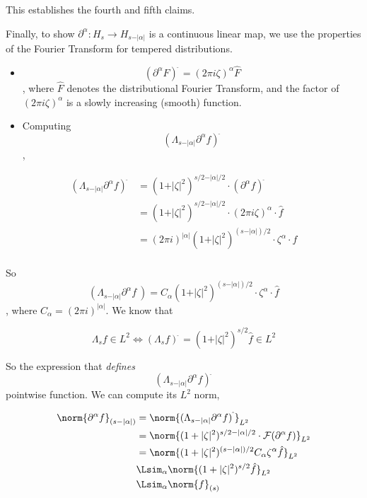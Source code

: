 This establishes the fourth and fifth claims.

Finally, to show \(\partial^\alpha: H_s\to H_{s-\vert\alpha\vert}\) is a
continuous linear map, we use the properties of the Fourier Transform
for tempered distributions.

\begin{itemize}
\tightlist
\item
  \[(\partial^\alpha F)^{\hat{\:}} = (2\pi i \zeta)^{\alpha}\hat{F}\],
  where \(\hat{F}\) denotes the distributional Fourier Transform, and
  the factor of \((2\pi i \zeta)^{\alpha}\) is a slowly increasing
  (smooth) function.
\item
  Computing
  \[(\Lambda_{s-\vert\alpha\vert}\partial^\alpha f)^{\hat{\:}}\],
\end{itemize}

\[
\begin{align}
(\Lambda_{s-\vert\alpha\vert}\partial^\alpha f)^{\hat{\:}} &= (1+\vert\zeta\vert^2)^{s/2 - \vert\alpha\vert/2}\cdot(\partial^\alpha f)^{\hat{\:}}\\
&= (1+\vert\zeta\vert^2)^{s/2 - \vert\alpha\vert/2}\cdot(2\pi i \zeta)^{\alpha}
\cdot \hat{f}\\
&= (2\pi i)^{\vert\alpha\vert}(1+\vert\zeta\vert^2)^{(s-\vert\alpha\vert)/2}\cdot \zeta^\alpha\cdot\hat{f}\\
\end{align}
\]

So
\[({\Lambda_{s-\vert\alpha\vert}\partial^\alpha f}^{\hat{\:}}) = C_{\alpha} (1+\vert\zeta\vert^2)^{(s-\vert\alpha\vert)/2}\cdot \zeta^\alpha \cdot\hat{f}\],
where \(C_\alpha = (2\pi i)^{\vert\alpha\vert}\). We know that

\[
\Lambda_s f\in L^2\iff (\Lambda_s f)^{\hat{\:}} = (1+\vert\zeta\vert^2)^{s/2}\hat{f}\in L^2
\]

So the expression that \emph{defines}
\[(\Lambda_{s-\vert\alpha\vert}\partial^\alpha f)^{\hat{\:}}\] pointwise
function. We can compute its \(L^2\) norm,

\[
\begin{align}
\norm{\partial^{\alpha}f}_{(s-\vert\alpha\vert)} &=\norm{(\Lambda_{s-\vert\alpha\vert}\partial^\alpha f)^{\hat{\:}}}_{L^2}\\
&= \norm{(1+\vert\zeta\vert^2)^{s/2 - \vert\alpha\vert/2}\cdot\mathcal{F}(\partial^\alpha f)}_{L^2}\\
&= \norm{(1+\vert\zeta\vert^2)^{(s-\vert\alpha\vert)/2}C_{\alpha}\zeta^{\alpha}\hat{f}}_{L^2}\\
&\Lsim_{\alpha}\norm{(1+\vert\zeta\vert^2)^{s/2}\hat{f}}_{L^2}\\
&\Lsim_{\alpha}\norm{f}_{(s)}
\end{align}
\]


